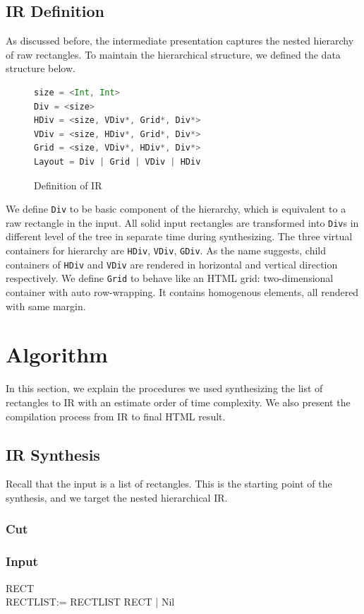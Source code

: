 \documentclass[runningheads]{llncs}
\begin{document}
\subsection{IR Definition}
As discussed before, the intermediate presentation captures the nested hierarchy of raw rectangles. To maintain the hierarchical structure, we defined the data structure below.
\begin{figure}[H]
\vspace*{-0.2in}
\begin{lstlisting}[language=Scala,mathescape=true]
size = <Int, Int>
Div = <size>
HDiv = <size, VDiv*, Grid*, Div*>
VDiv = <size, HDiv*, Grid*, Div*>
Grid = <size, VDiv*, HDiv*, Div*>
Layout = Div | Grid | VDiv | HDiv
\end{lstlisting}
\caption{Definition of IR}
\end{figure}
We define \lstinline|Div| to be basic component of the hierarchy, which is equivalent to a raw rectangle in the input. All solid input rectangles are transformed into \lstinline|Div|s in different level of the tree in separate time during synthesizing. The three virtual containers for hierarchy are   \lstinline|HDiv|, \lstinline|VDiv|, \lstinline|GDiv|. As the name suggests, child containers of \lstinline|HDiv| and \lstinline|VDiv| are rendered in horizontal and vertical direction respectively. We define \lstinline|Grid| to behave like an HTML grid: two-dimensional container with auto row-wrapping. It contains homogenous elements, all rendered with same margin. 


\section{Algorithm}
In this section, we explain the procedures we used synthesizing the list of rectangles to IR with an estimate order of time complexity. We also present the compilation process from IR to final HTML result.
\subsection{IR Synthesis}
Recall that the input is a list of rectangles. This is the starting point of the synthesis, and we target the nested hierarchical IR. 
\subsubsection{Cut}


\subsubsection{Input}
RECT\\
RECTLIST:= RECTLIST RECT | Nil
\end{document}

